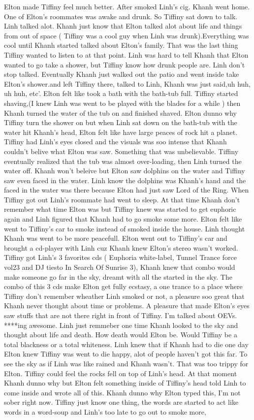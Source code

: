 \documentclass[12pt]{book}
\begin{document}
Elton made Tiffiny feel much better. After smoked Linh's cig. Khanh went home. One of Elton's roommates was awake and drunk. So Tiffiny sat down to talk. Linh talked alot. Khanh just know that Elton talked alot about life and things from out of space ( Tiffiny was a cool guy when Linh was drunk).Everything was cool until Khanh started talked about Elton's family. That was the last thing Tiffiny wanted to listen to at that point. Linh was hard to tell Khanh that Elton wanted to go take a shower, but Tiffiny know how drunk people are. Linh don't stop talked. Eventually Khanh just walked out the patio and went inside take Elton's shower.and left Tiffiny there, talked to Linh, Khanh was just said,uh huh, uh huh, etc'. Elton felt like took a bath with the bath-tub full. Tiffiny started shaving,(I knew Linh was went to be played with the blades for a while ) then Khanh turned the water of the tub on and finished shaved. Elton dunno why Tiffiny turn the shower on but when Linh sat down on the bath-tub with the water hit Khanh's head, Elton felt like have large peaces of rock hit a planet. Tiffiny had Linh's eyes closed and the visuals was soo intense that Khanh couldn't belive what Elton was saw. Something that was unbelievable. Tiffiny eventually realized that the tub was almost over-loading, then Linh turned the water off. Khanh won't beleive but Elton saw dolphins on the water and Tiffiny saw even faced in the water. Linh know the dolphins was Khanh's hand and the faced in the water was there because Elton had just saw Lord of the Ring. When Tiffiny got out Linh's roommate had went to sleep. At that time Khanh don't remember what time Elton was but Tiffiny knew was started to get euphoric again and Linh figured that Khanh had to go smoke some more. Elton felt like went to Tiffiny's car to smoke instead of smoked inside the house. Linh thought Khanh was went to be more peacefull. Elton went out to Tiffiny's car and brought a cd-player with Linh cuz Khanh knew Elton's stereo wasn't worked. Tiffiny got Linh's 3 favorites cds ( Euphoria white-label, Tunnel Trance force vol23 and DJ tiesto In Search Of Sunrise 3), Khanh knew that combo would make someone go far in the sky, dreamt with all the started in the sky. The combo of this 3 cds make Elton get fully ecstasy, a one trance to a place where Tiffiny don't remember wheather Linh smoked or not, a pleasure soo great that Khanh never thought about time or problems. A pleasure that made Elton's eyes saw stuffs that are not there right in front of Tiffiny. I'm talked about OEVs. ****ing awesome. Linh just remmeber one time Khanh looked to the sky and thought about life and death. How death would Elton be. Would Tiffiny be a total blackness or a total whiteness. Linh knew that if Khanh had to die one day Elton knew Tiffiny was went to die happy, alot of people haven't got this far. To see the sky as if Linh was like rained and Khanh wasn't. That was too trippy for Elton. Tiffiny could feel the rocks fell on top of Linh's head. At that moment Khanh dunno why but Elton felt something inside of Tiffiny's head told Linh to come inside and wrote all of this. Khanh dunno why Elton typed this, I'm not sober right now. Tiffiny just know one thing, the words are started to act like words in a word-soup and Linh's too late to go out to smoke more, 
\end{document}

